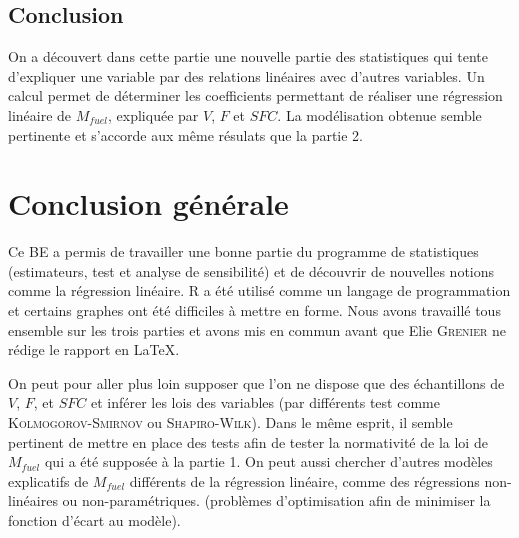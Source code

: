 \documentclass{article}
\begin{document}
\subsection{Conclusion}
On a découvert dans cette partie une nouvelle partie des statistiques qui tente d'expliquer une variable par des relations linéaires avec d'autres variables. Un calcul permet de déterminer les coefficients permettant de réaliser une régression linéaire de $M_{fuel}$, expliquée par $V$, $F$ et $SFC$. La modélisation obtenue semble pertinente et s'accorde aux même résulats que la partie 2.
\section{Conclusion générale}
Ce BE a permis de travailler une bonne partie du programme de statistiques (estimateurs, test et analyse de sensibilité) et de découvrir de nouvelles notions comme la régression linéaire. R a été utilisé comme un langage de programmation et certains graphes ont été difficiles à mettre en forme. Nous avons travaillé tous ensemble sur les trois parties et avons mis en commun avant que Elie \textsc{Grenier} ne rédige le rapport en \LaTeX. 

On peut pour aller plus loin supposer que l'on ne dispose que des échantillons de $V$, $F$, et $SFC$ et inférer les lois des variables (par différents test comme \textsc{Kolmogorov-Smirnov} ou \textsc{Shapiro-Wilk}). Dans le même esprit, il semble pertinent de mettre en place des tests afin de tester la normativité de la loi de $M_{fuel}$ qui a été supposée à la partie 1. On peut aussi chercher d'autres modèles explicatifs de $M_{fuel}$ différents de la régression linéaire, comme des régressions non-linéaires ou non-paramétriques. (problèmes d'optimisation afin de minimiser la fonction d'écart au modèle).





\end{document}
